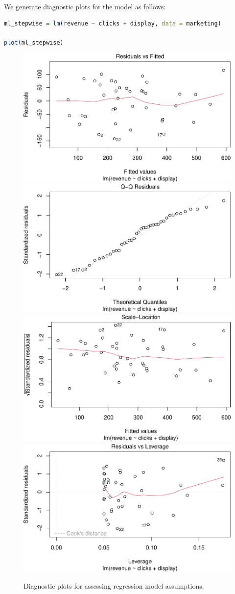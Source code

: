 \documentclass[
]{book}
\theoremstyle{definition}
\theoremstyle{definition}
\theoremstyle{definition}
\theoremstyle{definition}
\theoremstyle{remark}
\begin{document}
We generate diagnostic plots for the model as follows:

\begin{lstlisting}[language=R]
ml_stepwise = lm(revenue ~ clicks + display, data = marketing)

plot(ml_stepwise)  
\end{lstlisting}

\begin{figure}
\includegraphics[width=0.5\linewidth]{regression_files/figure-latex/model-diagnostics-1} \includegraphics[width=0.5\linewidth]{regression_files/figure-latex/model-diagnostics-2} \includegraphics[width=0.5\linewidth]{regression_files/figure-latex/model-diagnostics-3} \includegraphics[width=0.5\linewidth]{regression_files/figure-latex/model-diagnostics-4} \caption{Diagnostic plots for assessing regression model assumptions.}\label{fig:model-diagnostics}
\end{figure}
\end{document}
